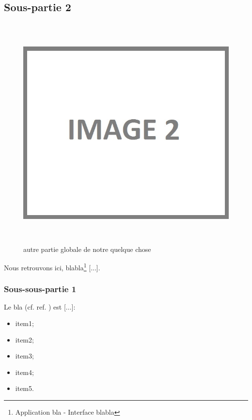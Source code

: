 
\newpage{}

\subsection{Sous-partie 2}

\begin{figure}[!ht]
\begin{center}
\includegraphics[height=12cm]{autre_partie/image2}
\end{center}
\caption[autre partie]{autre partie globale de notre quelque chose}
\end{figure}

Nous retrouvons ici, blabla\footnote{Application bla - Interface blabla} [...].

\subsubsection{Sous-sous-partie 1}

Le bla (cf. ref. \cite{cite6}) est [...]:

\begin{itemize}
\item item1;
\item item2;
\item item3;
\item item4;
\item item5.
\end{itemize}

